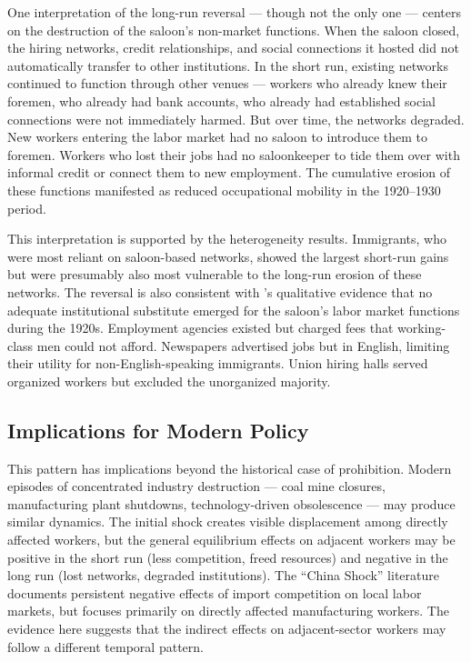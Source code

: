 \documentclass[12pt]{article}
\begin{document}
One interpretation of the long-run reversal --- though not the only one --- centers on the destruction of the saloon's non-market functions. When the saloon closed, the hiring networks, credit relationships, and social connections it hosted did not automatically transfer to other institutions. In the short run, existing networks continued to function through other venues --- workers who already knew their foremen, who already had bank accounts, who already had established social connections were not immediately harmed. But over time, the networks degraded. New workers entering the labor market had no saloon to introduce them to foremen. Workers who lost their jobs had no saloonkeeper to tide them over with informal credit or connect them to new employment. The cumulative erosion of these functions manifested as reduced occupational mobility in the 1920--1930 period.

This interpretation is supported by the heterogeneity results. Immigrants, who were most reliant on saloon-based networks, showed the largest short-run gains but were presumably also most vulnerable to the long-run erosion of these networks. The reversal is also consistent with \citet{powers1998}'s qualitative evidence that no adequate institutional substitute emerged for the saloon's labor market functions during the 1920s. Employment agencies existed but charged fees that working-class men could not afford. Newspapers advertised jobs but in English, limiting their utility for non-English-speaking immigrants. Union hiring halls served organized workers but excluded the unorganized majority.

\subsection{Implications for Modern Policy}

This pattern has implications beyond the historical case of prohibition. Modern episodes of concentrated industry destruction --- coal mine closures, manufacturing plant shutdowns, technology-driven obsolescence --- may produce similar dynamics. The initial shock creates visible displacement among directly affected workers, but the general equilibrium effects on adjacent workers may be positive in the short run (less competition, freed resources) and negative in the long run (lost networks, degraded institutions). The ``China Shock'' literature \citep{autor2003} documents persistent negative effects of import competition on local labor markets, but focuses primarily on directly affected manufacturing workers. The evidence here suggests that the indirect effects on adjacent-sector workers may follow a different temporal pattern.
\end{document}
